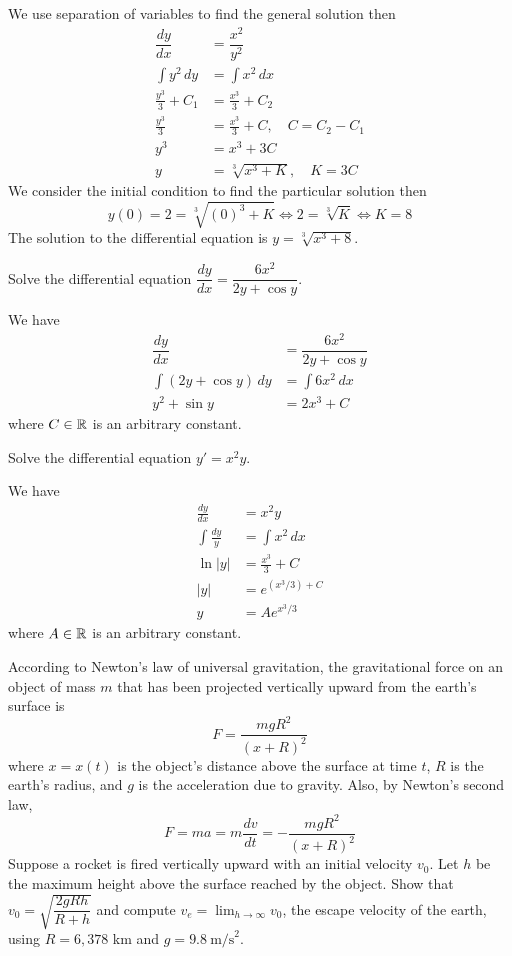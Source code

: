 \begin{solution}
    We use separation of variables to find the general solution then
    \begin{align*}
        \dfrac{dy}{dx} &= \dfrac{x^2}{y^2} \\
        \int y^2\,dy &= \int x^2\,dx \\
        \frac{y^3}{3}+C_1 &= \frac{x^3}{3}+C_2 \\
        \frac{y^3}{3} &=\frac{x^3}{3}+C,\quad C=C_2-C_1 \\
        y^3 &= x^3+3C \\
        y &= \sqrt[3]{x^3+K},\quad K=3C
    \end{align*}
    We consider the initial condition to find the particular solution then
    \[y(0)=2=\sqrt[3]{(0)^3+K}\iff 2=\sqrt[3]{K}\iff K=8\]
    The solution to the differential equation is \(y=\sqrt[3]{x^3+8}\).
\end{solution}
\begin{problem}
    Solve the differential equation \(\dfrac{dy}{dx}=\dfrac{6x^2}{2y+\cos y}\).
\end{problem}
\begin{solution}
    We have
    \begin{align*}
        \dfrac{dy}{dx} &= \dfrac{6x^2}{2y+\cos y} \\
        \int(2y+\cos y)\,dy &= \int 6x^2\,dx \\
        y^2+\sin y &= 2x^3+C
    \end{align*}
    where \(C\in\mathbb{R}\) is an arbitrary constant.
\end{solution}
\begin{problem}
    Solve the differential equation \(y'=x^2y\).
\end{problem}
\begin{solution}
    We have
    \begin{align*}
        \frac{dy}{dx} &= x^2y \\ \int \frac{dy}{y} &= \int x^2\,dx \\
        \ln |y| &= \frac{x^3}{3}+C \\ |y| &= e^{(x^3/3)+C}\\ y &= Ae^{x^3/3}
    \end{align*}
    where \(A\in\mathbb{R}\) is an arbitrary constant.
\end{solution}
\begin{problem}
    According to Newton's law of universal gravitation,
    the gravitational force on an object of mass \(m\) that has been
    projected vertically upward from the earth's surface is
    \[F=\frac{mgR^2}{(x+R)^2}\]
    where \(x=x(t)\) is the object's distance
    above the surface at time \(t\), \(R\) is the
    earth's radius, and \(g\) is the acceleration due to gravity.
    Also, by Newton's second law,
    \[F=ma=m\frac{dv}{dt}=-\frac{mgR^2}{(x+R)^2}\]
    Suppose a rocket is fired vertically upward with an initial velocity \(v_0\).
    Let \(h\) be the maximum height above the surface reached by the object.
    Show that \(v_0=\sqrt{\dfrac{2gRh}{R+h}}\) and compute
    \(v_e=\lim_{h\to\infty}v_0\), the escape velocity of the earth, using
    \(R=6,378\) km and \(g=9.8\ \text{m/s}^2\).
\end{problem}
